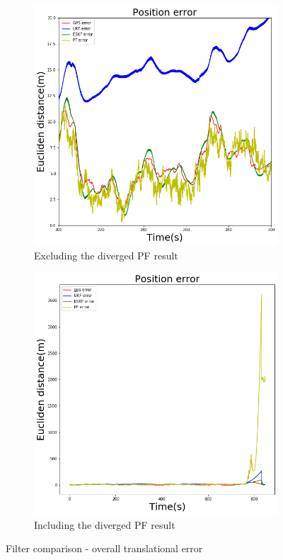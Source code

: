 \begin{figure}[htp]
    \begin{subfigure}{0.5\textwidth}
        \centering
        \includegraphics[width=1\textwidth]{figs/overall.png}
        \caption{Excluding the diverged PF result}
    \end{subfigure}%
    \begin{subfigure}{0.5\textwidth}
        \includegraphics[width=1\textwidth]{figs/overall_diverge.png}
        \caption{Including the diverged PF result}
    \end{subfigure}
    \vspace{-0.5cm}
    \caption{Filter comparison - overall translational error}
    \label{fig:ch:errorPositionOverall}
    \vspace{0.5cm}
\end{figure}


